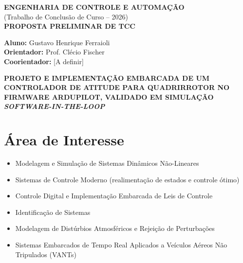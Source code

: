 \documentclass[12pt,a4paper]{article}
\begin{document}
\begin{center}
    {\large\bfseries ENGENHARIA DE CONTROLE E AUTOMAÇÃO}\\[0.3em]
    (Trabalho de Conclusão de Curso -- 2026)\\[1.2em]
    {\large\bfseries PROPOSTA PRELIMINAR DE TCC}\\[1.8em]
\end{center}

\noindent\textbf{Aluno:} Gustavo Henrique Ferraioli\\[0.4em]
\noindent\textbf{Orientador:} Prof. Clécio Fischer\\[0.2em]
\noindent\textbf{Coorientador:} [A definir]\\[1.5em]

\begin{center}
    {\large\bfseries PROJETO E IMPLEMENTAÇÃO EMBARCADA DE UM\\
    CONTROLADOR DE ATITUDE PARA QUADRIRROTOR NO\\
    FIRMWARE ARDUPILOT, VALIDADO EM SIMULAÇÃO\\
    \emph{SOFTWARE-IN-THE-LOOP}}
\end{center}
\vspace{1.5em}

\section{Área de Interesse}

\begin{itemize}[leftmargin=2cm,nosep,topsep=2pt]
    \item Modelagem e Simulação de Sistemas Dinâmicos Não-Lineares
    \item Sistemas de Controle Moderno (realimentação de estados e controle ótimo)
    \item Controle Digital e Implementação Embarcada de Leis de Controle
    \item Identificação de Sistemas
    \item Modelagem de Distúrbios Atmosféricos e Rejeição de Perturbações
    \item Sistemas Embarcados de Tempo Real Aplicados a Veículos Aéreos
          Não Tripulados (VANTs)
\end{itemize}
\end{document}
